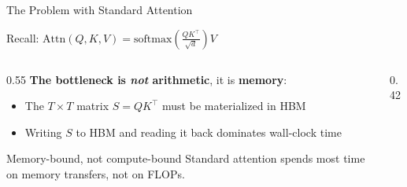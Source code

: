 \begin{frame}{The Problem with Standard Attention}

  Recall: $\text{Attn}(Q,K,V) = \text{softmax}\!\left(\frac{QK^\top}{\sqrt{d}}\right) V$

  \vspace{0.2em}
  \begin{columns}
    \begin{column}{0.55\textwidth}
      \textbf{The bottleneck is \emph{not} arithmetic}, it is \textbf{memory}:
      \begin{itemize}
        \item The $T \times T$ matrix $S = QK^\top$ must be materialized in HBM
        \item Writing $S$ to HBM and reading it back dominates wall-clock time
      \end{itemize}

      \begin{alertblock}{Memory-bound, not compute-bound}
        Standard attention spends most time on memory transfers, not on FLOPs.
      \end{alertblock}

      {\small \cite{dao2022flashattention} \quad \cite{dao2023flashattention2} \quad \cite{jamil2024flashattention}}
    \end{column}
    \begin{column}{0.42\textwidth}
      \centering
\end{column}
\end{columns}
\end{frame}
